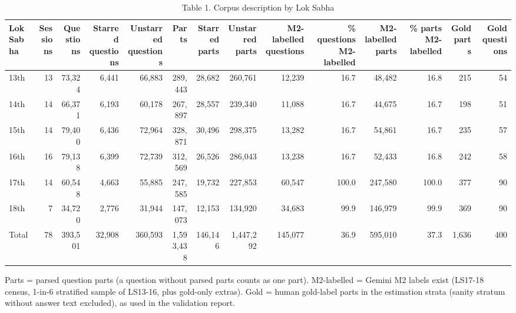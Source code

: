 \begin{table}[ht]
\centering
\small
\caption{Table 1. Corpus description by Lok Sabha}
\begin{tabular}{lrrrrrrrrrrrrr}
\toprule
Lok Sabha & Sessions & Questions & Starred questions & Unstarred questions & Parts & Starred parts & Unstarred parts & M2-labelled questions & \% questions M2-labelled & M2-labelled parts & \% parts M2-labelled & Gold parts & Gold questions \\
\midrule
13th & 13 & 73,324 & 6,441 & 66,883 & 289,443 & 28,682 & 260,761 & 12,239 & 16.7 & 48,482 & 16.8 & 215 & 54 \\
14th & 14 & 66,371 & 6,193 & 60,178 & 267,897 & 28,557 & 239,340 & 11,088 & 16.7 & 44,675 & 16.7 & 198 & 51 \\
15th & 14 & 79,400 & 6,436 & 72,964 & 328,871 & 30,496 & 298,375 & 13,282 & 16.7 & 54,861 & 16.7 & 235 & 57 \\
16th & 16 & 79,138 & 6,399 & 72,739 & 312,569 & 26,526 & 286,043 & 13,238 & 16.7 & 52,433 & 16.8 & 242 & 58 \\
17th & 14 & 60,548 & 4,663 & 55,885 & 247,585 & 19,732 & 227,853 & 60,547 & 100.0 & 247,580 & 100.0 & 377 & 90 \\
18th & 7 & 34,720 & 2,776 & 31,944 & 147,073 & 12,153 & 134,920 & 34,683 & 99.9 & 146,979 & 99.9 & 369 & 90 \\
Total & 78 & 393,501 & 32,908 & 360,593 & 1,593,438 & 146,146 & 1,447,292 & 145,077 & 36.9 & 595,010 & 37.3 & 1,636 & 400 \\
\bottomrule
\end{tabular}
\par\footnotesize Parts = parsed question parts (a question without parsed parts counts as one part). M2-labelled = Gemini M2 labels exist (LS17-18 census, 1-in-6 stratified sample of LS13-16, plus gold-only extras). Gold = human gold-label parts in the estimation strata (sanity stratum without answer text excluded), as used in the validation report.
\end{table}
